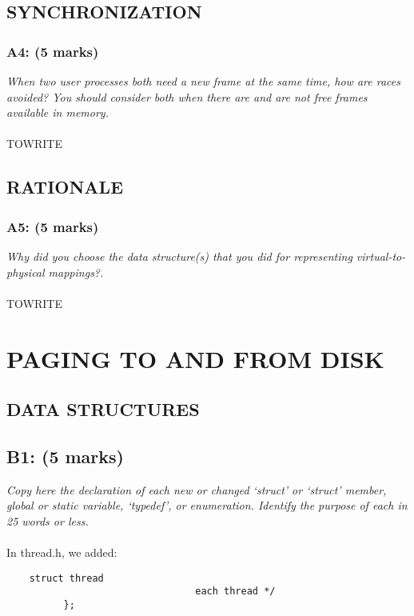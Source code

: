 \documentclass{article}
\begin{document}
\subsection{SYNCHRONIZATION}

\subsubsection*{A4: (5 marks) }
\textit{When two user processes both need a new frame at the same time,
how are races avoided? You should consider both when there are
and are not free frames available in memory.}
\\ \\
TOWRITE

\subsection{RATIONALE}

\subsubsection*{A5: (5 marks) }
\textit{Why did you choose the data structure(s) that you did for representing virtual-to-physical mappings?.}
\\ \\
TOWRITE


\section{PAGING TO AND FROM DISK}

\subsection{DATA STRUCTURES}

\subsection*{B1: (5 marks) }

\textit{Copy here the declaration of each new or changed ‘struct’ or ‘struct’
member, global or static variable, ‘typedef’, or enumeration. Identify the
purpose of each in 25 words or less.}
\\\\
In thread.h, we added:
\begin{lstlisting}
    struct thread
                                 each thread */
          };
\end{lstlisting}
\end{document}
